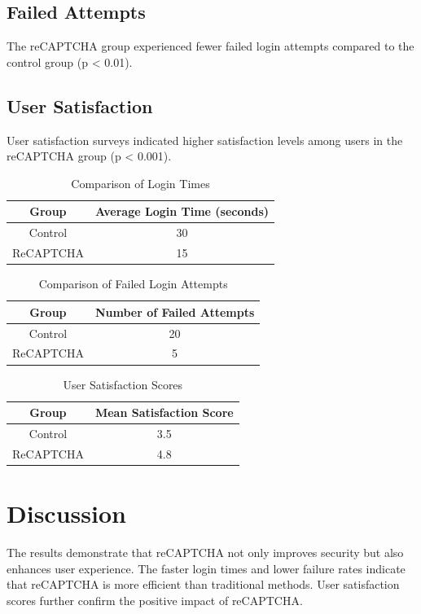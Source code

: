 \documentclass{article}
\begin{document}
\subsection{Failed Attempts}
The reCAPTCHA group experienced fewer failed login attempts compared to the control group (p < 0.01).

\subsection{User Satisfaction}
User satisfaction surveys indicated higher satisfaction levels among users in the reCAPTCHA group (p < 0.001).

\begin{table}[ht]
\centering
\caption{Comparison of Login Times}
\label{tab:login_times}
\begin{tabular}{|c|c|}
\hline
\textbf{Group} & \textbf{Average Login Time (seconds)} \\
\hline
Control & 30 \\
ReCAPTCHA & 15 \\
\hline
\end{tabular}
\end{table}

\begin{table}[ht]
\centering
\caption{Comparison of Failed Login Attempts}
\label{tab:failed_attempts}
\begin{tabular}{|c|c|}
\hline
\textbf{Group} & \textbf{Number of Failed Attempts} \\
\hline
Control & 20 \\
ReCAPTCHA & 5 \\
\hline
\end{tabular}
\end{table}

\begin{table}[ht]
\centering
\caption{User Satisfaction Scores}
\label{tab:user_satisfaction}
\begin{tabular}{|c|c|}
\hline
\textbf{Group} & \textbf{Mean Satisfaction Score} \\
\hline
Control & 3.5 \\
ReCAPTCHA & 4.8 \\
\hline
\end{tabular}
\end{table}

\section{Discussion}
The results demonstrate that reCAPTCHA not only improves security but also enhances user experience. The faster login times and lower failure rates indicate that reCAPTCHA is more efficient than traditional methods. User satisfaction scores further confirm the positive impact of reCAPTCHA.
\end{document}
